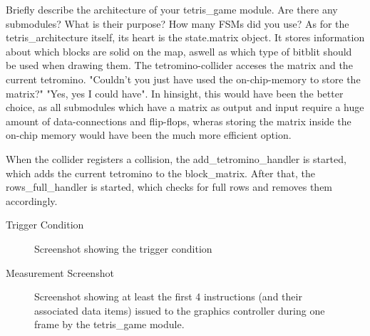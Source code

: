 \documentclass[10pt,a4paper,titlepage,oneside]{article}
\begin{document}
\begin{qa}{Briefly describe the architecture of your \textsf{tetris\_game} module. Are there any submodules? What is their purpose? How many FSMs did you use?}
As for the tetris_architecture itself, its heart is the state.matrix object.
It stores information about which blocks are solid on the map, aswell as which type of bitblit should be used when drawing them. The tetromino-collider acceses the matrix and 
the current tetromino.
"Couldn't you just have used the on-chip-memory to store the matrix?" "Yes, yes I could have". In hinsight, this would have been the better choice, as all submodules which have a matrix as output and input require 
a huge amount of data-connections and flip-flops, wheras storing the matrix inside the on-chip memory would have been the much more efficient option.

When the collider registers a collision, the add_tetromino_handler is started, which adds the current tetromino to the block_matrix.
After that, the rows_full_handler is started, which checks for full rows and removes them accordingly. 




\end{qa}


\begin{qa}{Trigger Condition}
	\begin{figure}[h!]
		\centering
		\dummyimage
		\caption{Screenshot showing the trigger condition}
	\end{figure}
\end{qa}

\begin{qa}{Measurement Screenshot}
	\begin{figure}[h!]
		\centering
		\dummyimage
		\caption{Screenshot showing at least the first 4 instructions (and their associated data items) issued to the graphics controller during one frame by the \textsf{tetris\_game} module.}
	\end{figure}
\end{qa}
\end{document}
